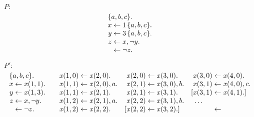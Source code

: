 \begin{Loesung}%
\rm
\begin{UList}
\item $P:{}$
\begin{equation*}
\begin{array}[t]{r@{{}\leftarrow{}}l}
\multicolumn{2}{l}{\{a,b,c\}.}
\\
x & 1\,\{a,b,c\}.
\\
y & 3\,\{a,b,c\}.
\\
z & x,\naf y.
\\
& \naf z.
\end{array}
\end{equation*}
\item $P':{}$
\begin{equation*}
\begin{array}[t]{r@{{}\leftarrow{}}l@{\qquad}r@{{}\leftarrow{}}l@{\quad}r@{{}\leftarrow{}}l@{\quad}r@{{}\leftarrow{}}l}
\multicolumn{2}{l}{\{a,b,c\}.}
&
\mathit{x}(1,0) & \mathit{x}(2,0).
&
\mathit{x}(2,0) & \mathit{x}(3,0).
&
\mathit{x}(3,0) & \mathit{x}(4,0).
\\
x & \mathit{x}(1,1).
&
\mathit{x}(1,1) & \mathit{x}(2,0), a.
&
\mathit{x}(2,1) & \mathit{x}(3,0), b.
&
\mathit{x}(3,1) & \mathit{x}(4,0), c.
\\
y & \mathit{x}(1,3).
&
\mathit{x}(1,1) & \mathit{x}(2,1).
&
\mathit{x}(2,1) & \mathit{x}(3,1).
&
[\mathit{x}(3,1) & \mathit{x}(4,1).]
\\
z & x,\naf y.
&
\mathit{x}(1,2) & \mathit{x}(2,1), a.
&
\mathit{x}(2,2) & \mathit{x}(3,1), b.
&
\multicolumn{2}{l}{\dots}
\\
& \naf z.
&
\mathit{x}(1,2) & \mathit{x}(2,2).
&
[\mathit{x}(2,2) & \mathit{x}(3,2).]
&


\end{array}
\end{equation*}
\end{UList}
\end{Loesung}
